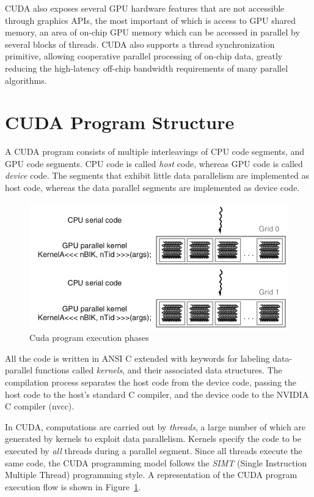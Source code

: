\documentclass[12pt, a4paper]{report}
\begin{document}
CUDA also exposes several GPU hardware features that are not accessible through
graphics APIs, the most important of which is access to GPU shared memory, an
area of on-chip GPU memory which can be accessed in parallel by several blocks
of threads.
CUDA also supports a thread synchronization primitive, allowing cooperative
parallel processing of on-chip data, greatly reducing the high-latency off-chip
bandwidth requirements of many parallel algorithms.

\section{CUDA Program Structure}
A CUDA program consists of multiple interleavings of CPU code segments,
and GPU code segments.
CPU code is called \emph{host} code, whereas GPU code is called \emph{device}
code.
The segments that exhibit little data parallelism are implemented as host code,
whereas the data parallel segments are implemented as device code.

\begin{figure}[h]
\centering
\includegraphics[scale=0.35]{figs/cuda_program_execution_phases}
\caption{Cuda program execution phases}
\label{fig:cuda_program_execution_phases}
\end{figure}

All the code is written in ANSI C extended with keywords for labeling data-
parallel functions called \emph{kernels}, and their associated data structures.
The compilation process separates the host code from the device code, passing
the host code to the host's standard C compiler, and the device code to the
NVIDIA C compiler (nvcc).

In CUDA, computations are carried out by \emph{threads}, a large number of which
are generated by kernels to exploit data parallelism.
Kernels specify the code to be executed by \emph{all} threads during a parallel
segment.
Since all threads execute the same code, the CUDA programming model follows the
\emph{SIMT} (Single Instruction Multiple Thread) programming style.
A representation of the CUDA program execution flow is shown in
Figure~\ref{fig:cuda_program_execution_phases}.
\end{document}
